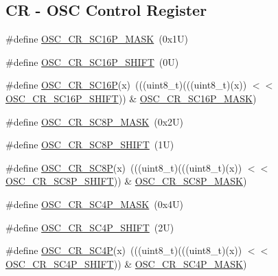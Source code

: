 \subsection*{CR -\/ O\+SC Control Register}
\begin{DoxyCompactItemize}
\item 
\#define \mbox{\hyperlink{group___o_s_c___register___masks_ga8c73f0e22875a434f8031986a9e5f8b4}{O\+S\+C\+\_\+\+C\+R\+\_\+\+S\+C16\+P\+\_\+\+M\+A\+SK}}~(0x1\+U)
\item 
\#define \mbox{\hyperlink{group___o_s_c___register___masks_ga4bcf6535cd7e7c4ff935f6b544ca3f9a}{O\+S\+C\+\_\+\+C\+R\+\_\+\+S\+C16\+P\+\_\+\+S\+H\+I\+FT}}~(0\+U)
\item 
\#define \mbox{\hyperlink{group___o_s_c___register___masks_ga312c9e0891936e3b1a5e0f8f0caca4e9}{O\+S\+C\+\_\+\+C\+R\+\_\+\+S\+C16P}}(x)~(((uint8\+\_\+t)(((uint8\+\_\+t)(x)) $<$$<$ \mbox{\hyperlink{group___o_s_c___register___masks_ga4bcf6535cd7e7c4ff935f6b544ca3f9a}{O\+S\+C\+\_\+\+C\+R\+\_\+\+S\+C16\+P\+\_\+\+S\+H\+I\+FT}})) \& \mbox{\hyperlink{group___o_s_c___register___masks_ga8c73f0e22875a434f8031986a9e5f8b4}{O\+S\+C\+\_\+\+C\+R\+\_\+\+S\+C16\+P\+\_\+\+M\+A\+SK}})
\item 
\#define \mbox{\hyperlink{group___o_s_c___register___masks_ga1a5a0db08efaf66c34caf98136cbec11}{O\+S\+C\+\_\+\+C\+R\+\_\+\+S\+C8\+P\+\_\+\+M\+A\+SK}}~(0x2\+U)
\item 
\#define \mbox{\hyperlink{group___o_s_c___register___masks_ga6f17376a1571a200e55cac51d1358503}{O\+S\+C\+\_\+\+C\+R\+\_\+\+S\+C8\+P\+\_\+\+S\+H\+I\+FT}}~(1\+U)
\item 
\#define \mbox{\hyperlink{group___o_s_c___register___masks_ga7b761b8bfa5dd396029c880348a7f81f}{O\+S\+C\+\_\+\+C\+R\+\_\+\+S\+C8P}}(x)~(((uint8\+\_\+t)(((uint8\+\_\+t)(x)) $<$$<$ \mbox{\hyperlink{group___o_s_c___register___masks_ga6f17376a1571a200e55cac51d1358503}{O\+S\+C\+\_\+\+C\+R\+\_\+\+S\+C8\+P\+\_\+\+S\+H\+I\+FT}})) \& \mbox{\hyperlink{group___o_s_c___register___masks_ga1a5a0db08efaf66c34caf98136cbec11}{O\+S\+C\+\_\+\+C\+R\+\_\+\+S\+C8\+P\+\_\+\+M\+A\+SK}})
\item 
\#define \mbox{\hyperlink{group___o_s_c___register___masks_ga18f4104a5a6c0d94f0592ee06732fe03}{O\+S\+C\+\_\+\+C\+R\+\_\+\+S\+C4\+P\+\_\+\+M\+A\+SK}}~(0x4\+U)
\item 
\#define \mbox{\hyperlink{group___o_s_c___register___masks_gab1724a5b1e96efb22e48a9478ae8cf25}{O\+S\+C\+\_\+\+C\+R\+\_\+\+S\+C4\+P\+\_\+\+S\+H\+I\+FT}}~(2\+U)
\item 
\#define \mbox{\hyperlink{group___o_s_c___register___masks_gac2ce9a5b1c516b1416ee3709d405e4e2}{O\+S\+C\+\_\+\+C\+R\+\_\+\+S\+C4P}}(x)~(((uint8\+\_\+t)(((uint8\+\_\+t)(x)) $<$$<$ \mbox{\hyperlink{group___o_s_c___register___masks_gab1724a5b1e96efb22e48a9478ae8cf25}{O\+S\+C\+\_\+\+C\+R\+\_\+\+S\+C4\+P\+\_\+\+S\+H\+I\+FT}})) \& \mbox{\hyperlink{group___o_s_c___register___masks_ga18f4104a5a6c0d94f0592ee06732fe03}{O\+S\+C\+\_\+\+C\+R\+\_\+\+S\+C4\+P\+\_\+\+M\+A\+SK}})
$$
\end{DoxyCompactItemize}

